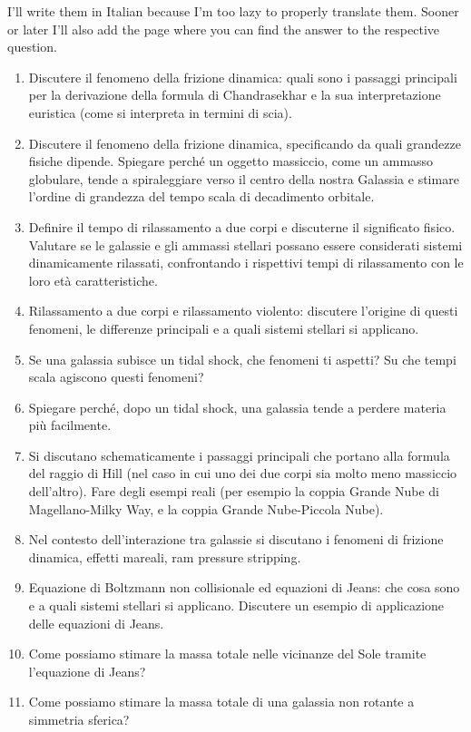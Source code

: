 I'll write them in Italian because I'm too lazy to properly translate them. Sooner or later I'll also add the page where you can find the answer to the respective question.

\begin{enumerate}
    \item Discutere il fenomeno della frizione dinamica: quali sono i passaggi principali per la derivazione della formula di Chandrasekhar e la sua interpretazione euristica (come si interpreta in termini di scia).
    \item Discutere il fenomeno della frizione dinamica, specificando da quali grandezze fisiche dipende. Spiegare perché un oggetto massiccio, come un ammasso globulare, tende a spiraleggiare verso il centro della nostra Galassia e stimare l’ordine di grandezza del tempo scala di decadimento orbitale.
    \item Definire il tempo di rilassamento a due corpi e discuterne il significato fisico. Valutare se le galassie e gli ammassi stellari possano essere considerati sistemi dinamicamente rilassati, confrontando i rispettivi tempi di rilassamento con le loro età caratteristiche.
    \item Rilassamento a due corpi e rilassamento violento: discutere l’origine di questi fenomeni, le differenze principali e a quali sistemi stellari si applicano.
    \item Se una galassia subisce un tidal shock, che fenomeni ti aspetti? Su che tempi scala agiscono questi fenomeni?
    \item Spiegare perché, dopo un tidal shock, una galassia tende a perdere materia più facilmente.
    \item Si discutano schematicamente i passaggi principali che portano alla formula del raggio di Hill (nel caso in cui uno dei due corpi sia molto meno massiccio dell’altro). Fare degli esempi reali (per esempio la coppia Grande Nube di Magellano-Milky Way, e la coppia Grande Nube-Piccola Nube).
    \item Nel contesto dell’interazione tra galassie si discutano i fenomeni di frizione dinamica, effetti mareali, ram pressure stripping.
    \item Equazione di Boltzmann non collisionale ed equazioni di Jeans: che cosa sono e a quali sistemi stellari si applicano. Discutere un esempio di applicazione delle equazioni di Jeans.
    \item Come possiamo stimare la massa totale nelle vicinanze del Sole tramite l’equazione di Jeans?
    \item Come possiamo stimare la massa totale di una galassia non rotante a simmetria sferica?

\end{enumerate}
